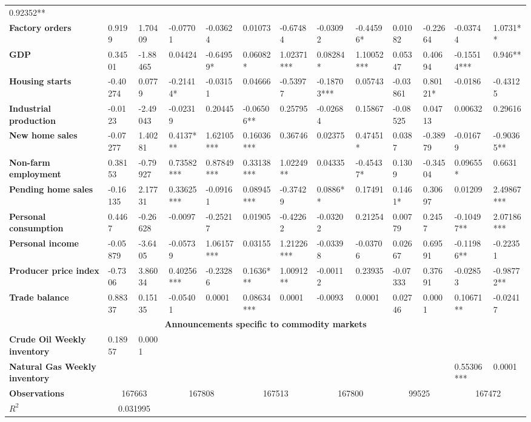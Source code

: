 \begin{sidewaystable}
{\begin{tabular}{@{}lllllllllllll@{}}
0.92352** \\ \textbf{Factory orders}& 0.9199 & 1.70409 & -0.07701 & -0.03624 & 0.01073 & -0.67484 & -0.03092 & -0.44596* & 0.01082 & -0.22664 & -0.03744 & 1.0731** \\ \textbf{GDP}& 0.34501 & -1.88465 & 0.04424 & -0.64959* & 0.06082* & 1.02371*** & 0.08284* & 1.10052*** & 0.05347 & 0.40694 & -0.15514*** & 0.946** \\ \textbf{Housing starts}& -0.40274 & 0.0779 & -0.21414* & -0.03151 & 0.04666 & -0.53977 & -0.18703*** & 0.05743 & -0.03861 & 0.80121* & -0.0186 & -0.43125 \\ \textbf{Industrial production}& -0.0123 & -2.49043 & -0.02319 & 0.20445 & -0.06506** & 0.25795 & -0.02684 & 0.15867 & -0.08525 & 0.04713 & 0.00632 & 0.29616 \\ \textbf{New home sales}& -0.07277 & 1.40281 & 0.4137*** & 1.62105*** & 0.16036*** & 0.36746 & 0.02375 & 0.47451* & 0.0387 & -0.38979 & -0.01679 & -0.90365** \\ \textbf{Non-farm employment}& 0.38153 & -0.79927 & 0.73582*** & 0.87849*** & 0.33138*** & 1.02249** & 0.04335 & -0.45437* & 0.1309 & -0.34504 & 0.09655* & 0.6631 \\ \textbf{Pending home sales}& -0.16135 & 2.17731 & 0.33625*** & -0.09161 & 0.08945*** & -0.37429 & 0.0886** & 0.17491 & 0.1461* & 0.30697 & 0.01209 & 2.49867*** \\ \textbf{Personal consumption}& 0.4467 & -0.26628 & -0.0097 & -0.25217 & 0.01905 & -0.42262 & -0.03202 & 0.21254 & 0.00779 & 0.2457 & -0.10497** & 2.07186*** \\ \textbf{Personal income}& -0.05879 & -3.6405 & -0.05739 & 1.06157*** & 0.03155 & 1.21226*** & -0.03398 & -0.03706 & 0.02667 & 0.69591 & -0.11986** & -0.22351 \\ \textbf{Producer price index}& -0.7306 & 3.86034 & 0.40256*** & -0.23286 & 0.1636*** & 1.00912** & -0.00112 & 0.23935 & -0.07333 & 0.37691 & -0.02853 & -0.98772** \\ \textbf{Trade balance}& 0.88337 & 0.15135 & -0.05401 & 0.0001& 0.08634*** & 0.0001& -0.0093 & 0.0001& 0.02746 & 0.0001& 0.10671** & -0.02417 \\  \midrule \multicolumn{13}{c}{\textbf{Announcements specific to commodity markets}} \\ \midrule \textbf{Crude Oil Weekly inventory}& 0.18957 & 0.0001&  &  &  &  &  &  &  &  &  &  \\ \textbf{Natural Gas Weekly inventory}&  &  &  &  &  &  &  &  &  &  & 0.55306*** & 0.0001\\  \midrule \textbf{Observations}             &\multicolumn{2}{c}{ 167663 }                                                 & \multicolumn{2}{c}{ 167808 }                                                 & \multicolumn{2}{c}{ 167513 }                                                 & \multicolumn{2}{c}{ 167800 }                                                 & \multicolumn{2}{c}{ 99525 }                                                   & \multicolumn{2}{c}{ 167472 }                                                 \\ \textbf{$R^2$}             &\multicolumn{2}{c}{ 0.031995 }                       
\end{tabular}}
\end{sidewaystable}
